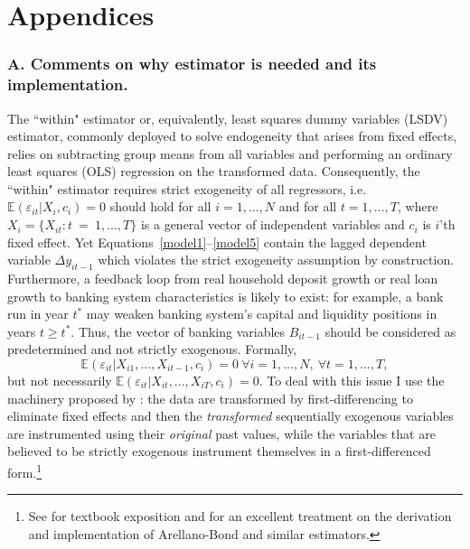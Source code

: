 \documentclass[12pt,a4paper]{article}
\begin{document}
\newpage
{}
{}



\newpage
{}
{}
\section*{Appendices}
\subsubsection*{\hypertarget{appendixA}{A. Comments on why \citet{arellano1991some} estimator is needed and its implementation.}}
The ``within" estimator or, equivalently, least squares dummy variables (LSDV) estimator, commonly deployed to solve endogeneity that arises from fixed effects, relies on subtracting group means from all variables and performing an ordinary least squares (OLS) regression on the transformed data. Consequently, the ``within" estimator requires strict exogeneity of all regressors, i.e. $\mathbb{E}(\varepsilon_{it}|X_{i}, c_{i}) = 0$ should hold for all $i = 1, ..., N$ and for all $t = 1, ..., T$, where $X_i = \{X_{it}: t\ =\ 1, ..., T\}$ is a general vector of independent variables and $c_{i}$ is $i$'th fixed effect. Yet Equations~\eqref{model1}--\eqref{model5} contain the lagged dependent variable $\Delta y_{it-1}$ which violates the strict exogeneity assumption by construction. Furthermore, a feedback loop from real household deposit growth or real loan growth to banking system characteristics is likely to exist: for example, a bank run in year $t^*$ may weaken banking system's capital and liquidity positions in years $t \geq t^*$. Thus, the vector of banking variables $B_{it-1}$ should be considered as predetermined and not strictly exogenous. Formally,
\begin{equation}
\mathbb{E}(\varepsilon_{it}|X_{i1}, ..., X_{it-1}, c_{i}) = 0 \ \forall i  = 1, ..., N, \ \forall t = 1 , ..., T,
\end{equation}
but not necessarily $\mathbb{E}(\varepsilon_{it}|X_{it}, ..., X_{iT}, c_{i}) = 0$. To deal with this issue I use the machinery proposed by \citet{arellano1991some}: the data are transformed by first-differencing to eliminate fixed effects and then the \emph{transformed} sequentially exogenous variables are instrumented using their \emph{original} past values, while the variables that are believed to be strictly exogenous instrument themselves in a first-differenced form.\footnote{See \citet[chapter 11.1]{wooldridge2010econometric} for textbook exposition and \citet{roodman2009m} for an excellent treatment on the derivation and implementation of Arellano-Bond and similar estimators.}
\end{document}
